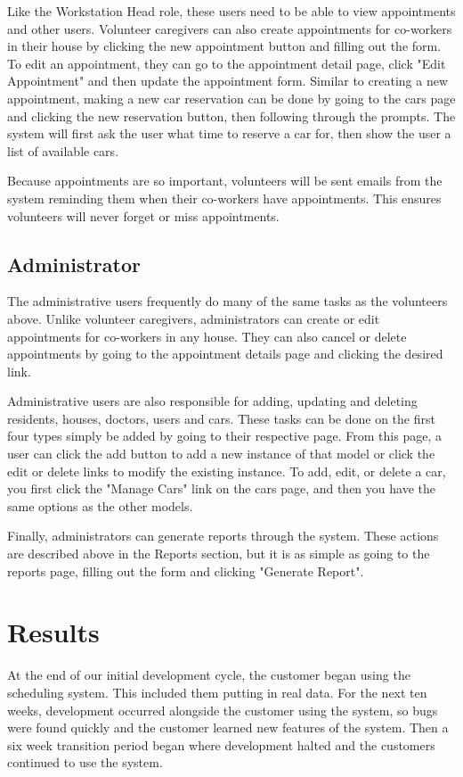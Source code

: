 \documentclass{sig-alternate}
\begin{document}
Like the Workstation Head role, these users need to be able to view appointments and other users. Volunteer caregivers can also create appointments for co-workers in their house by clicking the new appointment button and filling out the form. To edit an appointment, they can go to the appointment detail page, click "Edit Appointment" and then update the appointment form. Similar to creating a new appointment, making a new car reservation can be done by going to the cars page and clicking the new reservation button, then following through the prompts. The system will first ask the user what time to reserve a car for, then show the user a list of available cars.

Because appointments are so important, volunteers will be sent emails from the system reminding them when their co-workers have appointments. This ensures volunteers will never forget or miss appointments.

\subsection{Administrator}
The administrative users frequently do many of the same tasks as the volunteers above. Unlike volunteer caregivers, administrators can create or edit appointments for co-workers in any house. They can also cancel or delete appointments by going to the appointment details page and clicking the desired link.

Administrative users are also responsible for adding, updating and deleting residents, houses, doctors, users and cars. These tasks can be done on the first four types simply be added by going to their respective page. From this page, a user can click the add button to add a new instance of that model or click the edit or delete links to modify the existing instance. To add, edit, or delete a car, you first click the "Manage Cars" link on the cars page, and then you have the same options as the other models.

Finally, administrators can generate reports through the system. These actions are described above in the Reports section, but it is as simple as going to the reports page, filling out the form and clicking "Generate Report".

\section{Results}
At the end of our initial development cycle, the customer began using the scheduling system. This included them putting in real data. For the next ten weeks, development occurred alongside the customer using the system, so bugs were found quickly and the customer learned new features of the system. Then a six week transition period began where development halted and the customers continued to use the system.
\end{document}
